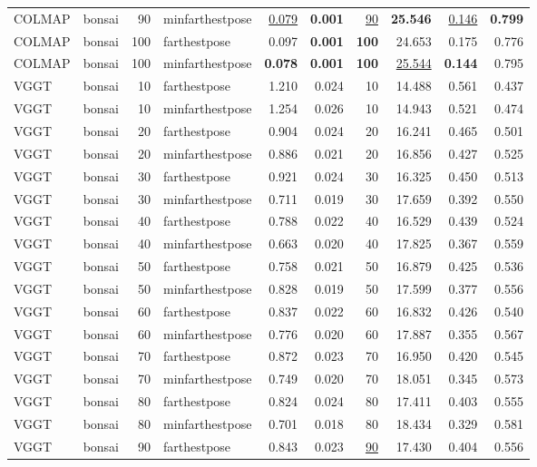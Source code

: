 \begin{table}[H]
\begin{tabular}{llrlrrrrrr}
COLMAP & bonsai & 90 & minfarthestpose & \underline{0.079} & \textbf{0.001} & \underline{90} & \textbf{25.546} & \underline{0.146} & \textbf{0.799} \\
COLMAP & bonsai & 100 & farthestpose & 0.097 & \textbf{0.001} & \textbf{100} & 24.653 & 0.175 & 0.776 \\
COLMAP & bonsai & 100 & minfarthestpose & \textbf{0.078} & \textbf{0.001} & \textbf{100} & \underline{25.544} & \textbf{0.144} & 0.795 \\
VGGT & bonsai & 10 & farthestpose & 1.210 & 0.024 & 10 & 14.488 & 0.561 & 0.437 \\
VGGT & bonsai & 10 & minfarthestpose & 1.254 & 0.026 & 10 & 14.943 & 0.521 & 0.474 \\
VGGT & bonsai & 20 & farthestpose & 0.904 & 0.024 & 20 & 16.241 & 0.465 & 0.501 \\
VGGT & bonsai & 20 & minfarthestpose & 0.886 & 0.021 & 20 & 16.856 & 0.427 & 0.525 \\
VGGT & bonsai & 30 & farthestpose & 0.921 & 0.024 & 30 & 16.325 & 0.450 & 0.513 \\
VGGT & bonsai & 30 & minfarthestpose & 0.711 & 0.019 & 30 & 17.659 & 0.392 & 0.550 \\
VGGT & bonsai & 40 & farthestpose & 0.788 & 0.022 & 40 & 16.529 & 0.439 & 0.524 \\
VGGT & bonsai & 40 & minfarthestpose & 0.663 & 0.020 & 40 & 17.825 & 0.367 & 0.559 \\
VGGT & bonsai & 50 & farthestpose & 0.758 & 0.021 & 50 & 16.879 & 0.425 & 0.536 \\
VGGT & bonsai & 50 & minfarthestpose & 0.828 & 0.019 & 50 & 17.599 & 0.377 & 0.556 \\
VGGT & bonsai & 60 & farthestpose & 0.837 & 0.022 & 60 & 16.832 & 0.426 & 0.540 \\
VGGT & bonsai & 60 & minfarthestpose & 0.776 & 0.020 & 60 & 17.887 & 0.355 & 0.567 \\
VGGT & bonsai & 70 & farthestpose & 0.872 & 0.023 & 70 & 16.950 & 0.420 & 0.545 \\
VGGT & bonsai & 70 & minfarthestpose & 0.749 & 0.020 & 70 & 18.051 & 0.345 & 0.573 \\
VGGT & bonsai & 80 & farthestpose & 0.824 & 0.024 & 80 & 17.411 & 0.403 & 0.555 \\
VGGT & bonsai & 80 & minfarthestpose & 0.701 & 0.018 & 80 & 18.434 & 0.329 & 0.581 \\
VGGT & bonsai & 90 & farthestpose & 0.843 & 0.023 & \underline{90} & 17.430 & 0.404 & 0.556 \\

\end{tabular}
\end{table}
